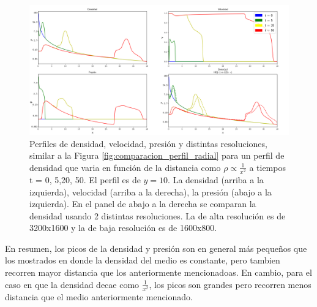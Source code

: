 \documentclass[12pt,a4paper]{book}
\begin{document}
\begin{figure}
  \centering
  \includegraphics[width = 1.0\textwidth]{./Figuras/jet/perfiles/perfiles_cuadraticos.png}
  \caption{Perfiles de densidad, velocidad, presión y distintas resoluciones, similar a la Figura 
  \ref{fig:comparacion_perfil_radial} para un perfil de densidad que varia en función de la distancia como
  $\rho \varpropto \frac{1}{x^2}$ a tiempos t = 0, 5,20, 50.
  El perfil es de $y = 10$.
  La densidad (arriba a la izquierda), velocidad (arriba a la derecha), la presión (abajo a la izquierda). 
  En el panel de abajo a la derecha se comparan la densidad usando 2 distintas resoluciones. La de alta resolución
  es de 3200x1600 y la de baja resolución es de 1600x800.}\label{fig:Decaimiento_cuadratico_densidad_jet}
\end{figure}

En resumen, los picos de la densidad y presión 
son en general más pequeños que los mostrados en donde la densidad del medio es constante, pero tambien recorren mayor 
distancia que los anteriormente mencionadoas. {\color{red}En cambio, para el caso en que la densidad} decae como $\frac{1}{x^2}$, 
los picos son grandes pero recorren menos distancia que el medio anteriormente mencionado.
\end{document}
